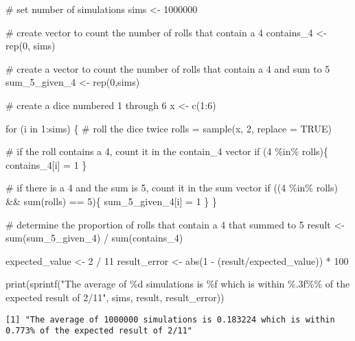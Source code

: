 \documentclass[
  letterpaper,
  DIV=11,
  numbers=noendperiod]{scrartcl}
\newenvironment{Shaded}{\begin{snugshade}}{\end{snugshade}}
\newcommand{\AttributeTok}[1]{\textcolor[rgb]{0.40,0.45,0.13}{#1}}
\newcommand{\CommentTok}[1]{\textcolor[rgb]{0.37,0.37,0.37}{#1}}
\newcommand{\ConstantTok}[1]{\textcolor[rgb]{0.56,0.35,0.01}{#1}}
\newcommand{\ControlFlowTok}[1]{\textcolor[rgb]{0.00,0.23,0.31}{#1}}
\newcommand{\DecValTok}[1]{\textcolor[rgb]{0.68,0.00,0.00}{#1}}
\newcommand{\FunctionTok}[1]{\textcolor[rgb]{0.28,0.35,0.67}{#1}}
\newcommand{\NormalTok}[1]{\textcolor[rgb]{0.00,0.23,0.31}{#1}}
\newcommand{\OtherTok}[1]{\textcolor[rgb]{0.00,0.23,0.31}{#1}}
\newcommand{\SpecialCharTok}[1]{\textcolor[rgb]{0.37,0.37,0.37}{#1}}
\newcommand{\StringTok}[1]{\textcolor[rgb]{0.13,0.47,0.30}{#1}}
\begin{document}
\begin{Shaded}
\begin{Highlighting}[]
\CommentTok{\# set number of simulations}
\NormalTok{sims }\OtherTok{\textless{}{-}} \DecValTok{1000000}

\CommentTok{\# create vector to count the number of rolls that contain a 4}
\NormalTok{contains\_4 }\OtherTok{\textless{}{-}} \FunctionTok{rep}\NormalTok{(}\DecValTok{0}\NormalTok{, sims)}

\CommentTok{\# create a vector to count the number of rolls that contain a 4 and sum to 5}
\NormalTok{sum\_5\_given\_4 }\OtherTok{\textless{}{-}} \FunctionTok{rep}\NormalTok{(}\DecValTok{0}\NormalTok{,sims)}

\CommentTok{\# create a dice numbered 1 through 6}
\NormalTok{x }\OtherTok{\textless{}{-}} \FunctionTok{c}\NormalTok{(}\DecValTok{1}\SpecialCharTok{:}\DecValTok{6}\NormalTok{)}

\ControlFlowTok{for}\NormalTok{ (i }\ControlFlowTok{in} \DecValTok{1}\SpecialCharTok{:}\NormalTok{sims) \{}
  \CommentTok{\# roll the dice twice}
\NormalTok{  rolls }\OtherTok{=} \FunctionTok{sample}\NormalTok{(x, }\DecValTok{2}\NormalTok{, }\AttributeTok{replace =} \ConstantTok{TRUE}\NormalTok{)}

    \CommentTok{\# if the roll contains a 4, count it in the contain\_4 vector}
    \ControlFlowTok{if}\NormalTok{ (}\DecValTok{4} \SpecialCharTok{\%in\%}\NormalTok{ rolls)\{}
\NormalTok{      contains\_4[i] }\OtherTok{=} \DecValTok{1}
\NormalTok{    \}}
    
    \CommentTok{\# if there is a 4 and the sum is 5, count it in the sum vector}
    \ControlFlowTok{if}\NormalTok{ ((}\DecValTok{4} \SpecialCharTok{\%in\%}\NormalTok{ rolls) }\SpecialCharTok{\&\&} \FunctionTok{sum}\NormalTok{(rolls) }\SpecialCharTok{==} \DecValTok{5}\NormalTok{)\{}
\NormalTok{      sum\_5\_given\_4[i] }\OtherTok{=} \DecValTok{1}
\NormalTok{    \}}
\NormalTok{\}}

\CommentTok{\# determine the proportion of rolls that contain a 4 that summed to 5}
\NormalTok{result }\OtherTok{\textless{}{-}} \FunctionTok{sum}\NormalTok{(sum\_5\_given\_4) }\SpecialCharTok{/} \FunctionTok{sum}\NormalTok{(contains\_4)}
\end{Highlighting}
\end{Shaded}

\begin{Shaded}
\begin{Highlighting}[]
\NormalTok{expected\_value }\OtherTok{\textless{}{-}} \DecValTok{2} \SpecialCharTok{/} \DecValTok{11}
\NormalTok{result\_error }\OtherTok{\textless{}{-}} \FunctionTok{abs}\NormalTok{(}\DecValTok{1} \SpecialCharTok{{-}}\NormalTok{ (result}\SpecialCharTok{/}\NormalTok{expected\_value)) }\SpecialCharTok{*} \DecValTok{100}

\FunctionTok{print}\NormalTok{(}\FunctionTok{sprintf}\NormalTok{(}\StringTok{"The average of \%d simulations is \%f which is within \%.3f\%\% of the expected result of 2/11"}\NormalTok{, sims, result, result\_error))}
\end{Highlighting}
\end{Shaded}

\begin{verbatim}
[1] "The average of 1000000 simulations is 0.183224 which is within 0.773% of the expected result of 2/11"
\end{verbatim}
\end{document}
